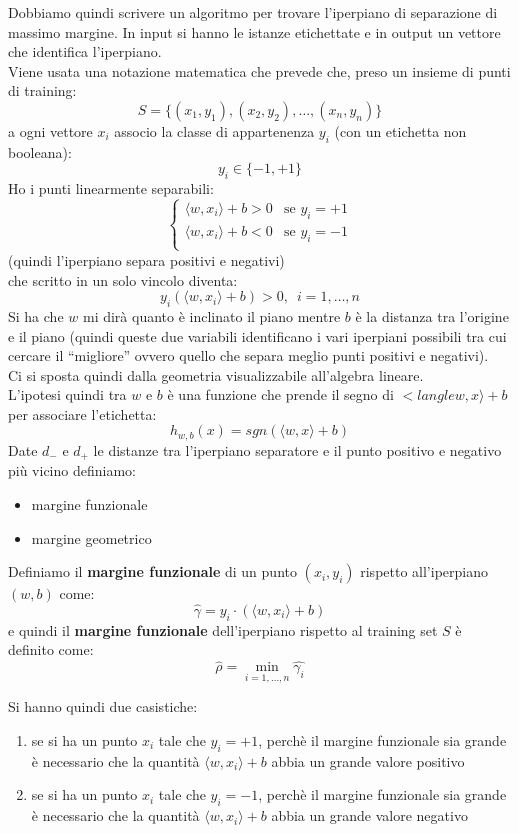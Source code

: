 Dobbiamo quindi scrivere un algoritmo per trovare l'iperpiano di separazione di
massimo margine. In input si hanno le istanze etichettate e in output un
vettore che identifica l'iperpiano.\\
Viene usata una notazione matematica che prevede che, preso un insieme di punti
di training:
\[S = \{(x_1, y_1), (x_2, y_2),\ldots, (x_n, y_n)\}\]
a ogni vettore $x_i$ associo la classe di appartenenza $y_i$ (con un etichetta
non booleana):
\[y_i\in\{-1,+1\}\]
Ho i punti linearmente separabili:
\[
  \begin{cases}
    \langle w, x_i\rangle + b >0 &\mbox{se }y_i=+1\\
    \langle w, x_i\rangle + b <0 &\mbox{se }y_i=-1\\
  \end{cases}
\](quindi l'iperpiano separa positivi e negativi)\\
che scritto in un solo vincolo diventa:
\[y_i(\langle w, x_i\rangle + b )>0,\,\,\, i=1,\ldots, n\]
Si ha che $w$ mi dirà quanto è inclinato il piano mentre $b$ è la distanza tra
l'origine e il piano (quindi queste due variabili identificano i vari iperpiani
possibili tra cui cercare il ``migliore'' ovvero quello che separa meglio punti
positivi e negativi).\\
Ci si sposta quindi dalla geometria visualizzabile all'algebra lineare.\\
L'ipotesi quindi tra $w$ e $b$ è una funzione che prende il segno di $<langle
w, x\rangle+b$ per associare l'etichetta:
\[h_{w, b}(x)=sgn(\langle w, x\rangle+b)\]
Date $d_-$ e $d_+$ le distanze tra l’iperpiano separatore e il punto positivo e
negativo più vicino definiamo:
\begin{itemize}
  \item margine funzionale
  \item margine geometrico
\end{itemize}
\begin{definizione}
  Definiamo il \textbf{margine funzionale} di un punto $(x_i, y_i)$ rispetto
  all'iperpiano $(w, b)$ come:
  \[\hat{\gamma}=y_i\cdot(\langle w, x_i\rangle+b)\]
  e quindi il \textbf{margine funzionale} dell'iperpiano rispetto al training
  set $S$ è definito come:
  \[\hat{\rho}=\min_{i=1,\ldots, n}\hat{\gamma_i}\]
\end{definizione}
Si hanno quindi due casistiche:
\begin{enumerate}
  \item se si ha un punto $x_i$ tale che $y_i=+1$, perchè il margine funzionale
  sia grande è necessario che la quantità
  $\langle w, x_i\rangle+b$ abbia un grande valore positivo
  \item se si ha un punto $x_i$ tale che $y_i=-1$, perchè il margine funzionale
  sia grande è necessario che  la quantità
  $\langle w, x_i\rangle+b$ abbia un grande valore negativo
\end{enumerate}
